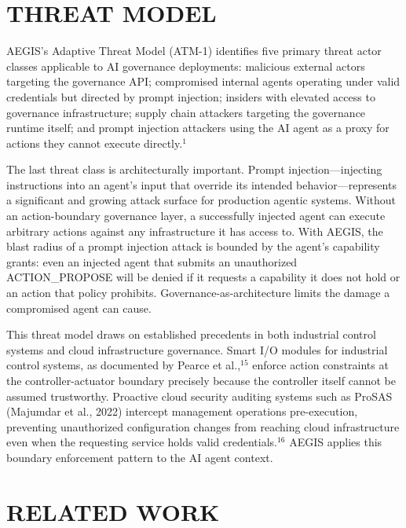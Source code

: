 \documentclass{IEEEcsmag}
\begin{document}
\section{THREAT MODEL}

AEGIS's Adaptive Threat Model (ATM-1) identifies five primary threat actor classes applicable to AI governance deployments: malicious external actors targeting the governance API; compromised internal agents operating under valid credentials but directed by prompt injection; insiders with elevated access to governance infrastructure; supply chain attackers targeting the governance runtime itself; and prompt injection attackers using the AI agent as a proxy for actions they cannot execute directly.$^{1}$

The last threat class is architecturally important. Prompt injection---injecting instructions into an agent's input that override its intended behavior---represents a significant and growing attack surface for production agentic systems. Without an action-boundary governance layer, a successfully injected agent can execute arbitrary actions against any infrastructure it has access to. With AEGIS, the blast radius of a prompt injection attack is bounded by the agent's capability grants: even an injected agent that submits an unauthorized ACTION\_PROPOSE will be denied if it requests a capability it does not hold or an action that policy prohibits. Governance-as-architecture limits the damage a compromised agent can cause.

This threat model draws on established precedents in both industrial control systems and cloud infrastructure governance. Smart I/O modules for industrial control systems, as documented by Pearce et al.,$^{15}$ enforce action constraints at the controller-actuator boundary precisely because the controller itself cannot be assumed trustworthy. Proactive cloud security auditing systems such as ProSAS (Majumdar et al., 2022) intercept management operations pre-execution, preventing unauthorized configuration changes from reaching cloud infrastructure even when the requesting service holds valid credentials.$^{16}$ AEGIS applies this boundary enforcement pattern to the AI agent context.

\section{RELATED WORK}
\end{document}
